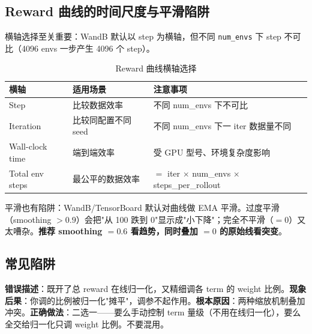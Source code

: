 \subsection{Reward 曲线的时间尺度与平滑陷阱}

横轴选择至关重要：WandB 默认以 step 为横轴，但不同 \verb|num_envs| 下 step 不可比（4096 envs 一步产生 4096 个 step）。

\begin{table}[H]
\centering
\caption{Reward 曲线横轴选择}
\label{tab:rlmc-diag-xaxis}
\begin{tabular}{p{3.4cm}p{4.0cm}p{5.0cm}}
\hline
横轴 & 适用场景 & 注意事项 \\
\hline
Step & 比较数据效率 & 不同 num\_envs 下不可比 \\
Iteration & 比较同配置不同 seed & 不同 num\_envs 下一 iter 数据量不同 \\
Wall-clock time & 端到端效率 & 受 GPU 型号、环境复杂度影响 \\
Total env steps & 最公平的数据效率 & $=$ iter $\times$ num\_envs $\times$ steps\_per\_rollout \\
\hline
\end{tabular}
\end{table}

平滑也有陷阱：WandB/TensorBoard 默认对曲线做 EMA 平滑。过度平滑（smoothing $>0.9$）会把"从 100 跌到 0"显示成"小下降"；完全不平滑（$=0$）又太嘈杂。\textbf{推荐 smoothing $=0.6$ 看趋势，同时叠加 $=0$ 的原始线看突变}。

\subsection{常见陷阱}


\begin{pitfall}
\textbf{错误描述}：既开了总 reward 在线归一化，又精细调各 term 的 weight 比例。\textbf{现象后果}：你调的比例被归一化"摊平"，调参不起作用。\textbf{根本原因}：两种缩放机制叠加冲突。\textbf{正确做法}：二选一——要么手动控制 term 量级（不用在线归一化），要么全交给归一化只调 weight 比例。不要混用。
\end{pitfall}

